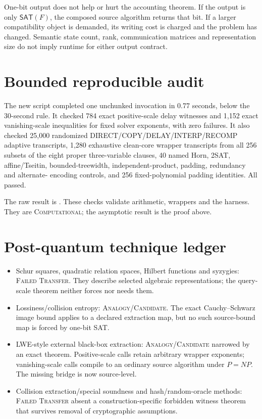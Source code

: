 \documentclass[11pt]{article}
\newcommand{\SAT}{\mathsf{SAT}}
\newcommand{\status}[1]{\textsc{#1}}
\begin{document}
One-bit output does not help or hurt the accounting theorem.  If the output
is only $\SAT(F)$, the composed source algorithm returns that bit.  If a
larger compatibility object is demanded, its writing cost is charged and the
problem has changed.  Semantic state count, rank, communication matrices and
representation size do not imply runtime for either output contract.

\section{Bounded reproducible audit}

The new script
 completed
one unchunked invocation in 0.77 seconds, below the 30-second rule.  It checked
784 exact positive-scale delay witnesses and 1,152 exact vanishing-scale
inequalities for fixed solver exponents, with zero failures.  It also checked
25,000 randomized DIRECT/COPY/DELAY/INTERP/RECOMP adaptive transcripts,
1,280 exhaustive clean-core wrapper transcripts from all 256 subsets of the
eight proper three-variable clauses, 40 named Horn, 2SAT, affine/Tseitin,
bounded-treewidth, independent-product, padding, redundancy and alternate-
encoding controls, and 256 fixed-polynomial padding identities.  All passed.

The raw result is
.
These checks validate arithmetic, wrappers and the harness.  They are
\status{Computational}; the asymptotic result is the proof above.

\section{Post-quantum technique ledger}

\begin{itemize}[leftmargin=1.5em]
\item Schur squares, quadratic relation spaces, Hilbert functions and
      syzygies: \status{Failed Transfer}.  They describe selected algebraic
      representations; the query-scale theorem neither forces nor needs them.
\item Lossiness/collision entropy: \status{Analogy/Candidate}.  The exact
      Cauchy--Schwarz image bound applies to a declared extraction map, but no
      such source-bound map is forced by one-bit SAT.
\item LWE-style external black-box extraction: \status{Analogy/Candidate}
      narrowed by an exact theorem.  Positive-scale calls retain arbitrary
      wrapper exponents; vanishing-scale calls compile to an ordinary source
      algorithm under $P=NP$.  The missing bridge is now source-level.
\item Collision extraction/special soundness and hash/random-oracle methods:
      \status{Failed Transfer} absent a construction-specific forbidden
      witness theorem that survives removal of cryptographic assumptions.
\end{itemize}
\end{document}
